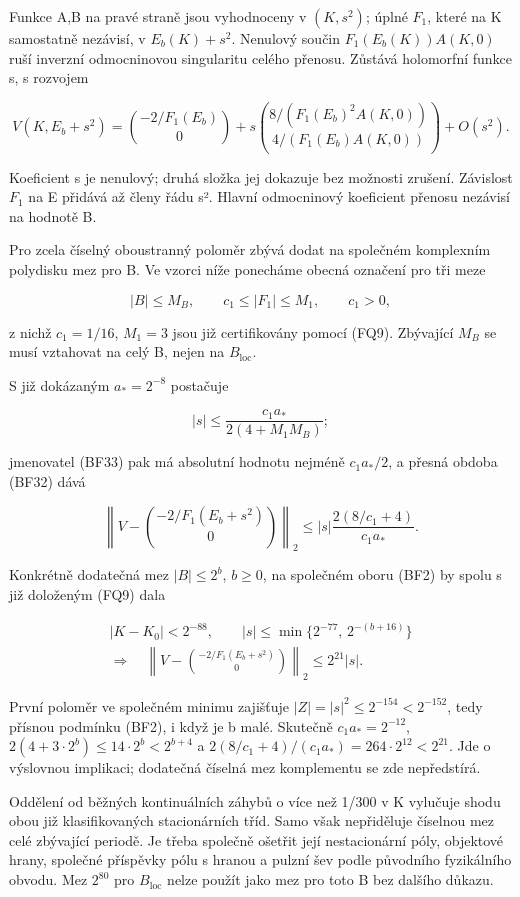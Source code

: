 \documentclass[11pt,a4paper]{article}
\theoremstyle{remark}\newtheorem{remark}[theorem]{Poznámka}
\numberwithin{equation}{section}
\begin{document}
Funkce A,B na pravé straně jsou vyhodnoceny v \((K,s^2)\); úplné
\(F_1\), které na K samostatně nezávisí, v \(E_b(K)+s^2\). Nenulový
součin \(F_1(E_b(K))A(K,0)\) ruší inverzní odmocninovou singularitu
celého přenosu. Zůstává holomorfní funkce s, s rozvojem

\[
V(K,E_b+s^2)=\binom{-2/F_1(E_b)}{0}
+s\binom{8/(F_1(E_b)^2 A(K,0))}
{4/(F_1(E_b)A(K,0))}+O(s^2).
\tag{BF34}
\]

Koeficient s je nenulový; druhá složka jej dokazuje bez možnosti
zrušení. Závislost \(F_1\) na E přidává až členy řádu s². Hlavní
odmocninový koeficient přenosu nezávisí na hodnotě B.

Pro zcela číselný oboustranný poloměr zbývá dodat na společném
komplexním polydisku mez pro B. Ve vzorci níže ponecháme obecná označení
pro tři meze

\[
|B|\le M_B,\qquad c_1\le|F_1|\le M_1,
\qquad c_1>0,
\tag{BF35}
\]

z nichž \(c_1=1/16\), \(M_1=3\) jsou již certifikovány pomocí (FQ9).
Zbývající \(M_B\) se musí vztahovat na celý B, nejen na
\(B_{\mathrm{loc}}\).

S již dokázaným \(a_*=2^{-8}\) postačuje

\[
|s|\le\frac{c_1a_*}{2(4+M_1M_B)};
\]

jmenovatel (BF33) pak má absolutní hodnotu nejméně \(c_1a_*/2\), a
přesná obdoba (BF32) dává

\[
\left\|V-\binom{-2/F_1(E_b+s^2)}{0}\right\|_2
\le |s|\frac{2(8/c_1+4)}{c_1a_*}.
\tag{BF36}
\]

Konkrétně dodatečná mez \(|B|\le2^b\), \(b\ge0\), na společném oboru
(BF2) by spolu s již doloženým (FQ9) dala

\[
\boxed{
\begin{gathered}
|K-K_0|<2^{-88},\qquad
|s|\le\min\{2^{-77},\,2^{-(b+16)}\}\\
\Longrightarrow\quad
\left\|V-\binom{-2/F_1(E_b+s^2)}{0}\right\|_2
\le2^{21}|s|.
\end{gathered}}
\tag{BF37}
\]

První poloměr ve společném minimu zajišťuje
\(|Z|=|s|^2\le2^{-154}<2^{-152}\), tedy přísnou podmínku (BF2), i když
je b malé. Skutečně \(c_1a_*=2^{-12}\),
\(2(4+3\cdot2^b)\le14\cdot2^b<2^{b+4}\) a
\(2(8/c_1+4)/(c_1a_*)=264\cdot2^{12}<2^{21}\). Jde o výslovnou
implikaci; dodatečná číselná mez komplementu se zde nepředstírá.

Oddělení od běžných kontinuálních záhybů o více než 1/300 v K vylučuje
shodu obou již klasifikovaných stacionárních tříd. Samo však nepřiděluje
číselnou mez celé zbývající periodě. Je třeba společně ošetřit její
nestacionární póly, objektové hrany, společné příspěvky pólu s hranou a
pulzní šev podle původního fyzikálního obvodu. Mez \(2^{80}\) pro
\(B_{\mathrm{loc}}\) nelze použít jako mez pro toto B bez dalšího
důkazu.
\end{document}
